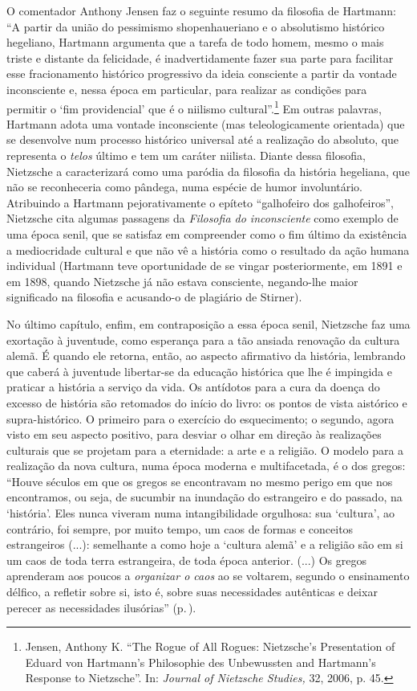 O comentador Anthony Jensen faz o seguinte resumo da filosofia de
Hartmann: ``A partir da união do pessimismo shopenhaueriano e o
absolutismo histórico hegeliano, Hartmann argumenta que a tarefa de todo
homem, mesmo o mais triste e distante da felicidade, é inadvertidamente
fazer sua parte para facilitar esse fracionamento histórico progressivo
da ideia consciente a partir da vontade inconsciente e, nessa época em
particular, para realizar as condições para permitir o `fim
providencial' que é o niilismo cultural''.\footnote{Jensen, Anthony K.
  ``The Rogue of All Rogues: Nietzsche's Presentation of Eduard von
  Hartmann's Philosophie des Unbewussten and Hartmann's Response
  to Nietzsche''. In: \emph{Journal of Nietzsche Studies,} 32, 2006, p.
  45.} Em outras palavras, Hartmann adota uma vontade inconsciente (mas
teleologicamente orientada) que se desenvolve num processo histórico
universal até a realização do absoluto, que representa o \emph{telos}
último e tem um caráter niilista. Diante dessa filosofia, Nietzsche a
caracterizará como uma paródia da filosofia da história hegeliana, que
não se reconheceria como pândega, numa espécie de humor involuntário.
Atribuindo a Hartmann pejorativamente o epíteto ``galhofeiro dos
galhofeiros'', Nietzsche cita algumas passagens da \emph{Filosofia do
inconsciente} como exemplo de uma época senil, que se satisfaz em
compreender como o fim último da existência a mediocridade cultural e
que não vê a história como o resultado da ação humana individual 
(Hartmann teve oportunidade de se vingar posteriormente, em 1891 e em
1898, quando Nietzsche já não estava consciente, negando-lhe maior
significado na filosofia e acusando-o de plagiário de Stirner).

No último capítulo, enfim, em contraposição a essa época senil,
Nietzsche faz uma exortação à juventude, como esperança para a tão
ansiada renovação da cultura alemã. É quando ele retorna, então, ao
aspecto afirmativo da história, lembrando que caberá à juventude
libertar-se da educação histórica que lhe é impingida e praticar a
história a serviço da vida. Os antídotos para a cura da doença do
excesso de história são retomados do início do livro: os pontos de vista
aistórico e supra-histórico. O primeiro para o exercício do
esquecimento; o segundo, agora visto em seu aspecto positivo, para
desviar o olhar em direção às realizações culturais que se projetam para
a eternidade: a arte e a religião. O modelo para a realização da nova
cultura, numa época moderna e multifacetada, é o dos gregos: ``Houve
séculos em que os gregos se encontravam no mesmo perigo em que nos
encontramos, ou seja, de sucumbir na inundação do estrangeiro e do
passado, na `história'. Eles nunca viveram numa intangibilidade
orgulhosa: sua `cultura', ao contrário, foi sempre, por muito tempo, um
caos de formas e conceitos estrangeiros (...): semelhante a como hoje a
`cultura alemã' e a religião são em si um caos de toda terra
estrangeira, de toda época anterior. (...) Os gregos aprenderam aos
poucos a \emph{organizar o caos} ao se voltarem, segundo o ensinamento
délfico, a refletir sobre si, isto é, sobre suas necessidades autênticas
e deixar perecer as necessidades ilusórias'' (p.\,\pageref{necessidadesilusorias}).

